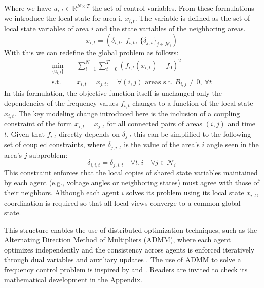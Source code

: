 \documentclass{article}
\begin{document}
Where we have $u_{i,t} \in \mathbb{R}^{N \times T}$ the set of control variables. From these formulations we introduce the local state for area i, $x_{i,t}$. The variable is defined as the set of local state variables of area $i$ and the state variables of the neighboring areas.
\begin{equation}
x_{i,t} = \left( \delta_{i,t},\ f_{i,t},\ \{ \delta_{j,t} \}_{j \in \mathcal{N}_i} \right)
\end{equation}
With this we can redefine the global problem as follows:
\begin{align}
\min_{\{u_{i,t}\}} \quad & \sum_{i=1}^{N} \sum_{t=0}^{T} \left( f_{i,t}(x_{i,t}) - f_0 \right)^2 \label{eq:decentralized_obj} \\
\text{s.t.} \quad & x_{i,t} = x_{j,t}, \quad \forall (i,j) \text{ areas s.t. } B_{i,j} \neq 0,\ \forall t \label{eq:coupling_constraint}
\end{align}
In this formulation, the objective function itself is unchanged only the dependencies of the frequency values $f_{i,t}$ changes to a function of the local state $x_{i,t}$. The key modeling change introduced here is the inclusion of a coupling constraint of the form $x_{i,t} = x_{j,t}$ for all connected pairs of areas $(i,j)$ and time $t$. Given that $f_{i,t}$ directly depends on $\delta_{j,t}$ this can be simplified to the following set of coupled constraints, where $\delta_{j, i, t}$ is the value of the area's $i$ angle seen in the area's $j$ subproblem:
\begin{equation}
    \delta_{i, i, t} = \delta_{j, i, t} \quad \forall t, i \quad \forall j \in \mathcal{N}_i
\end{equation}
This constraint enforces that the local copies of shared state variables maintained by each agent (e.g., voltage angles or neighboring states) must agree with those of their neighbors. Although each agent $i$ solves its problem using its local state $x_{i,t}$, coordination is required so that all local views converge to a common global state.

This structure enables the use of distributed optimization techniques, such as the Alternating Direction Method of Multipliers (ADMM), where each agent optimizes independently and the consistency across agents is enforced iteratively through dual variables and auxiliary updates \cite{ADMM:boyd}. The use of ADMM to solve a frequency control problem is inspired by \cite{paper:DMPC} and \cite{paper:marco}. Readers are invited to check its mathematical development in the Appendix. 
\end{document}
